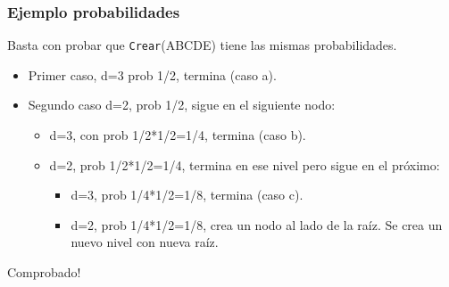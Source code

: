 \documentclass[10pt,handout]{beamer}
\begin{document}

\begin{frame}
\frametitle{Ejemplo probabilidades}

Basta con probar que \texttt{Crear}(ABCDE) tiene las mismas probabilidades.

\begin{itemize}
  \item Primer caso, d=3 prob 1/2, termina (caso a). \pause
  \item Segundo caso d=2, prob 1/2, sigue en el siguiente nodo:
\pause
    \begin{itemize}\pause
      \item d=3, con prob 1/2*1/2=1/4, termina (caso b).\pause
      \item d=2, prob 1/2*1/2=1/4, termina en ese nivel pero sigue en el próximo:
\pause
        \begin{itemize}\pause
          \item d=3, prob 1/4*1/2=1/8, termina (caso c).\pause
          \item d=2, prob 1/4*1/2=1/8, crea un nodo al lado de la raíz. Se crea
            un nuevo nivel con nueva raíz.
        \end{itemize}
    \end{itemize}
\end{itemize}

\pause

Comprobado!

\end{frame}
\end{document}

